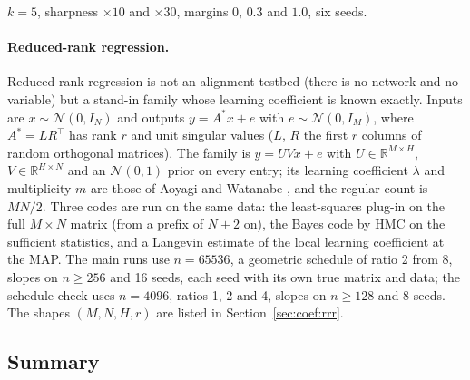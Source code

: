 \documentclass[11pt,a4paper]{article}
\begin{document}
$k=5$, sharpness $\times10$ and $\times30$, margins 0, $0.3$ and $1.0$, six seeds.

\paragraph{Reduced-rank regression.} Reduced-rank regression is not an alignment testbed (there is no network and no variable) but a stand-in family whose learning coefficient is known exactly. Inputs are $x\sim\mathcal N(0,I_N)$ and outputs $y=A^*x+e$ with $e\sim\mathcal N(0,I_M)$, where $A^*=LR^{\top}$ has rank $r$ and unit singular values ($L$, $R$ the first $r$ columns of random orthogonal matrices). The family is $y=UVx+e$ with $U\in\mathbb R^{M\times H}$, $V\in\mathbb R^{H\times N}$ and an $\mathcal N(0,1)$ prior on every entry; its learning coefficient $\lambda$ and multiplicity $m$ are those of Aoyagi and Watanabe \cite{aoyagiwatanabe2005}, and the regular count is $MN/2$. Three codes are run on the same data: the least-squares plug-in on the full $M\times N$ matrix (from a prefix of $N+2$ on), the Bayes code by HMC on the sufficient statistics, and a Langevin estimate of the local learning coefficient at the MAP. The main runs use $n=65536$, a geometric schedule of ratio 2 from 8, slopes on $n\ge256$ and 16 seeds, each seed with its own true matrix and data; the schedule check uses $n=4096$, ratios 1, 2 and 4, slopes on $n\ge128$ and 8 seeds. The shapes $(M,N,H,r)$ are listed in Section~\ref{sec:coef:rrr}.

\subsection{Summary}
\label{sec:tb:summary}
\end{document}

